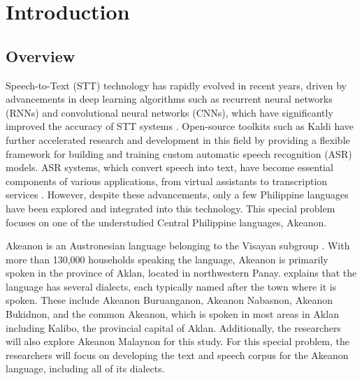 \chapter{Introduction}
\label{sec:researchdesc}    %

\section{Overview}
\label{sec:overview}

Speech-to-Text (STT) technology has rapidly evolved in recent years, driven by advancements in deep learning algorithms such as recurrent neural networks (RNNs) and convolutional neural networks (CNNs), which have significantly improved the accuracy of STT systems \cite{Televic:2024}. Open-source toolkits such as Kaldi have further accelerated research and development in this field by providing a flexible framework for building and training custom automatic speech recognition (ASR) models. ASR systems, which convert speech into text, have become essential components of various applications, from virtual assistants to transcription services . However, despite these advancements, only a few Philippine languages have been explored and integrated into this technology. This special problem focuses on one of the understudied \cite{Wellstood:2022} Central Philippine languages, Akeanon. 

Akeanon is an Austronesian language belonging to the Visayan subgroup \cite{Biray:2023}. With more than 130,000 households \cite{PSA:2023} speaking the language, Akeanon is primarily spoken in the province of Aklan, located in northwestern Panay.  explains that the language has several dialects, each typically named after the town where it is spoken. These include Akeanon Buruanganon, Akeanon Nabasnon, Akeanon Bukidnon, and the common Akeanon, which is spoken in most areas in Aklan including Kalibo, the provincial capital of Aklan. Additionally, the researchers will also explore Akeanon Malaynon for this study. For this special problem, the researchers will focus on developing the text and speech corpus for the Akeanon language, including all of its dialects.

